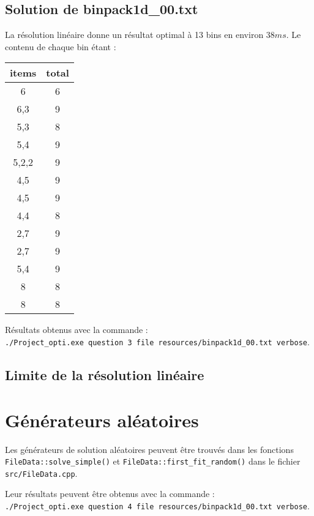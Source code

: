\documentclass[10pt,a4paper]{article}
\begin{document}
\subsection{Solution de binpack1d\_00.txt}

La résolution linéaire donne un résultat optimal à 13 bins en environ $38ms$.
Le contenu de chaque bin étant :

\begin{center}
  \begin{tabular}{ | c | c | }  \hline
    items & total \\ \hline
    6     & 6     \\ \hline
    6,3   & 9     \\ \hline
    5,3   & 8     \\ \hline
    5,4   & 9     \\ \hline
    5,2,2 & 9     \\ \hline
    4,5   & 9     \\ \hline
    4,5   & 9     \\ \hline
    4,4   & 8     \\ \hline
    2,7   & 9     \\ \hline
    2,7   & 9     \\ \hline
    5,4   & 9     \\ \hline
    8     & 8     \\ \hline
    8     & 8     \\ \hline
   \end{tabular}
\end{center}

Résultats obtenus avec la commande : \\ \texttt{./Project\_opti.exe question 3 file resources/binpack1d\_00.txt verbose}.

\subsection{Limite de la résolution linéaire}

\section{Générateurs aléatoires}

Les générateurs de solution aléatoires peuvent être trouvés dans les fonctions \texttt{FileData::solve\_simple()} et \texttt{FileData::first\_fit\_random()} dans le fichier \texttt{src/FileData.cpp}. 

Leur résultats peuvent être obtenus avec la commande : \\ \texttt{./Project\_opti.exe question 4 file resources/binpack1d\_00.txt verbose}.
\end{document}
